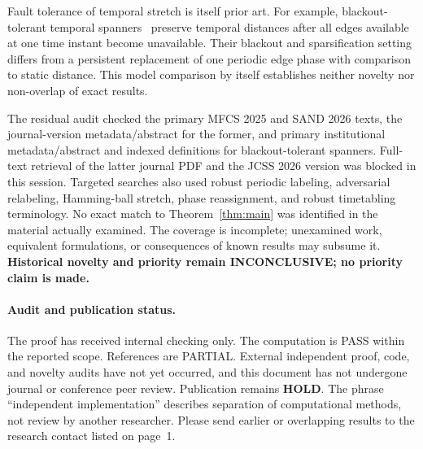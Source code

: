 \documentclass[11pt,a4paper]{article}
\begin{document}
Fault tolerance of temporal stretch is itself prior art. For example, blackout-tolerant temporal spanners~\cite{bilo} preserve temporal distances after all edges available at one time instant become unavailable. Their blackout and sparsification setting differs from a persistent replacement of one periodic edge phase with comparison to static distance. This model comparison by itself establishes neither novelty nor non-overlap of exact results.

The residual audit checked the primary MFCS 2025 and SAND 2026 texts, the journal-version metadata/abstract for the former, and primary institutional metadata/abstract and indexed definitions for blackout-tolerant spanners. Full-text retrieval of the latter journal PDF and the JCSS 2026 version was blocked in this session. Targeted searches also used robust periodic labeling, adversarial relabeling, Hamming-ball stretch, phase reassignment, and robust timetabling terminology. No exact match to Theorem~\ref{thm:main} was identified in the material actually examined. The coverage is incomplete; unexamined work, equivalent formulations, or consequences of known results may subsume it. \textbf{Historical novelty and priority remain INCONCLUSIVE; no priority claim is made.}

\paragraph{Audit and publication status.}
The proof has received internal checking only. The computation is PASS within the reported scope. References are PARTIAL. External independent proof, code, and novelty audits have not yet occurred, and this document has not undergone journal or conference peer review. Publication remains \textbf{HOLD}. The phrase ``independent implementation'' describes separation of computational methods, not review by another researcher. Please send earlier or overlapping results to the research contact listed on page~1.
\end{document}

